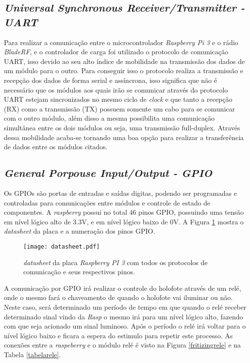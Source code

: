 \subsection{\emph{Universal Synchronous Receiver/Transmitter - UART}}
    Para realizar a comunicação entre o microcontrolador \emph{Raspberry Pi 3} e o rádio \emph{BladeRF}, e o controlador de carga foi utilizado o protocolo de comunicação UART, isso devido ao seu alto índice de mobilidade na transmissão dos dados de um módulo para o outro. Para conseguir isso o protocolo realiza a transmissão e recepção dos dados de forma serial e assíncrona, isso significa que não é necessário que os módulos aos quais irão se comunicar através do protocolo UART estejam sincronizados no mesmo ciclo de \emph{clock} e que tanto a recepção (RX) como a transmissão (TX) possuem somente um cabo para se comunicar com o outro módulo, além disso a mesma possibilita uma comunicação simultânea entre os dois módulos ou seja, uma transmissão full-duplex. Através dessa mobilidade acaba-se tornando uma boa opção para realizar a transferência de dados entre os módulos citados.
    
    


\subsection{\emph{General Porpouse Input/Output - GPIO}}

Os GPIOs são portas de entradas e saídas digitas, podendo ser programadas e controladas para comunicações entre módulos e controle de estado de componentes. A \emph{raspberry} possui no total 46 pinos GPIO, possuindo uma tensão em nível lógico alto de 3.3V, e em nível lógico baixo de 0V. A Figura \ref{datasheet} mostra o \emph{datasheet} da placa e a numeração dos pinos GPIO.

\begin{figure}[H]
    \centering
    \texttt{[image: datasheet.pdf]}
    \caption{\emph{datasheet} da placa \emph{Raspberry PI 3} com todos os protocolos de comunicação e seus respectivos pinos.}
    \label{datasheet}
\end{figure}


A comunicação por GPIO irá realizar o controle do holofote através de um relé, onde o mesmo fará o chaveamento de quando o holofote vai iluminar ou não. Neste caso, será determinado um período de tempo em que quando o relé receber determinado sinal vindo da \emph{Rasp} o mesmo irá para um nível lógico alto, fazendo com que seja acionado um sinal luminoso. Após o período o relé irá voltar para o nível lógico baixo e ficara a espera do estimulo para repetir este processo.  As conexões entre a \emph{raspeberry} e o módulo relé é visto na Figura \ref{fritizingrele} e na Tabela \ref{tabelarele}.

